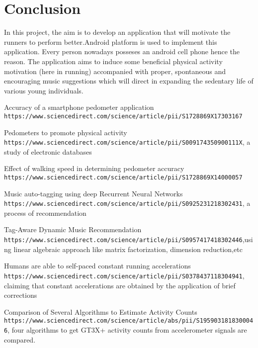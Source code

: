 \documentclass[10pt, a4paper]{article}
\begin{document}
\section{Conclusion}
In this project, the aim is to develop an application that will motivate the runners to perform better.Android platform is used to implement this application. Every person nowadays posseses an android cell phone hence the reason. The application aims to induce some beneficial physical activity motivation (here in running) accompanied with proper, spontaneous and encouraging music suggestions which will direct in expanding the sedentary life of various young individuals.

\begin{thebibliography}{9} 

 Accuracy of a smartphone pedometer application \\\texttt{https://www.sciencedirect.com/science/article/pii/S1728869X17303167}

 Pedometers to promote physical activity
\\\texttt{https://www.sciencedirect.com/science/article/pii/S009174350900111X}, a study of electronic databases

Effect of walking speed in determining pedometer accuracy \\\texttt{https://www.sciencedirect.com/science/article/pii/S1728869X14000057}

Music auto-tagging using deep Recurrent Neural Networks
\\\texttt{https://www.sciencedirect.com/science/article/pii/S0925231218302431}, a process of recommendation

Tag-Aware Dynamic Music Recommendation
\\\texttt{https://www.sciencedirect.com/science/article/pii/S0957417418302446},using linear algebraic approach like matrix factorization, dimension reduction,etc

Humans are able to self-paced constant running accelerations
\\\texttt{https://www.sciencedirect.com/science/article/pii/S0378437118304941}, claiming that constant accelerations are obtained by the application of brief corrections

Comparison of Several Algorithms to Estimate Activity Counts
\\\texttt{https://www.sciencedirect.com/science/article/abs/pii/S1959031818300046}, four algorithms to get GT3X+ activity counts from accelerometer signals are compared.



\end{thebibliography}
\end{document}
